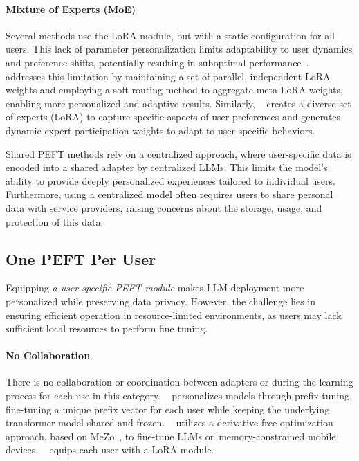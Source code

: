 \paragraph{Mixture of Experts (MoE)}


Several methods use the LoRA module, but with a static configuration for all users. This lack of parameter personalization limits adaptability to user dynamics and preference shifts, potentially resulting in suboptimal performance~\citep{cai2024survey}. ~\citep{zhu2024lifelong} addresses this limitation by maintaining a set of parallel, independent LoRA weights and employing a soft routing method to aggregate meta-LoRA weights, enabling more personalized and adaptive results. Similarly, 
~\citep{kongcustomizing} creates a diverse set of experts (LoRA) to capture specific aspects of user preferences and generates dynamic expert participation weights to adapt to user-specific behaviors.

Shared PEFT methods rely on a centralized approach, where user-specific data is encoded into a shared adapter by centralized LLMs. This limits the model's ability to provide deeply personalized experiences tailored to individual users. Furthermore, using a centralized model often requires users to share personal data with service providers, raising concerns about the storage, usage, and protection of this data.


\subsection{One PEFT Per User}
\label{subsec:one4one}

Equipping \textit{a user-specific PEFT module} makes LLM deployment more personalized while preserving data privacy. However, the challenge lies in ensuring efficient operation in resource-limited environments, as users may lack sufficient local resources to perform fine tuning. 

\paragraph{No Collaboration} 
There is no collaboration or coordination between adapters or during the learning process for each use in this category.
~\citep{zhong2021useradapter} personalizes models through prefix-tuning, fine-tuning a unique prefix vector for each user while keeping the underlying transformer model shared and frozen. 
~\citep{peng2024pocketllm} utilizes a derivative-free optimization approach, based on MeZo~\citep{malladi2023fine}, to fine-tune LLMs on memory-constrained mobile devices. ~\citep{DBLP:conf/emnlp/Tan000Y024} equips each user with a LoRA module.


